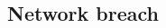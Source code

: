 \documentclass[twosided,a4,10pt]{article}
\begin{document}
\begin{multicols}{2}
\subsection{Network breach}
 \lipsum[1]









 
 

 
 


\end{multicols}
\end{document}

